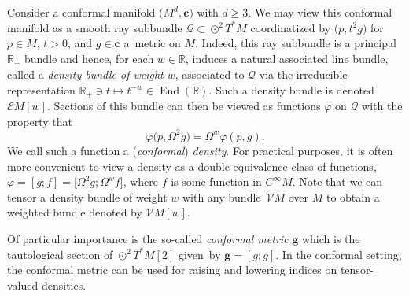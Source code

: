 \documentclass[10pt,a4paper]{article}
\numberwithin{equation}{section}
\newcommand{\ce}{\mathcal{E}}
\newcommand{\cc}{\boldsymbol{c}}
\newcommand{\bg}{\boldsymbol{g}}
\renewcommand{\=}{\stackrel \Lambda =}
\begin{document}
Consider a conformal manifold $\bigl(M^d,\cc\bigr)$ with $d \geq 3$. We may view this conformal manifold as a smooth ray subbundle $\mathcal{Q} \subset \odot^2 T^* M$ coordinatized by $\bigl(p,t^2 g\bigr)$ for $p \in M$, $t > 0$, and $g \in \cc$ a~metric on $M$. Indeed, this ray subbundle is a principal $\mathbb{R}_+$ bundle and hence, for each $w \in \mathbb{R}$, induces a natural associated line bundle, called a \textit{density bundle of weight $w$}, associated to $\mathcal{Q}$ via the irreducible representation $\mathbb{R}_+ \ni t \mapsto t^{-w} \in \operatorname{End}(\mathbb{R})$. Such a density bundle is denoted~$\ce M[w]$. Sections of this bundle can then be viewed as functions $\varphi$ on $\mathcal{Q}$ with the property that
\[\varphi\bigl(p, \Omega^2 g\bigr) = \Omega^w \varphi(p,g) .\]
We call such a function a (\textit{conformal}) \textit{density}. For practical purposes, it is often more convenient to view a density as a double equivalence class of functions, $\varphi = [g;f] = \bigl[\Omega^2 g; \Omega^w f\bigr]$, where $f$ is some function in $C^\infty M$. Note that we can tensor a density bundle of weight $w$ with any bundle~$\mathcal{V} M$ over $M$ to obtain a weighted bundle denoted by $\mathcal{V} M[w]$.

Of particular importance is the so-called \textit{conformal metric} $\bg$ which is the tautological section of $\odot^2 T^* M[2]$ given~by $\bg = [g;g]$. In the conformal setting, the conformal metric can be used for raising and lowering indices on tensor-valued densities.
\end{document}
